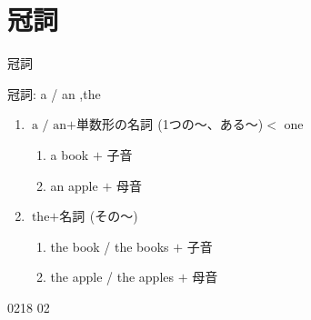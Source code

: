 \documentclass[aspectratio=169, xcolor={dvipsnames,table}]{beamer}
\begin{document}
  \section{冠詞}
  \begin{frame}[plain]{冠詞}
    \large

    冠詞: a / an ,\hspace{10pt}the

    \begin{enumerate}
      \item $\text{a / an}+ \text{単数形の名詞}$\,(1つの～、ある～)\hfill{}$<$ one
        \begin{enumerate}
          \item a book\hfill\textipa{/\textschwa /} $+$ 子音

          \item an apple\hfill{} $+$ 母音
        \end{enumerate}

      \item $\text{the}+ \text{名詞}$\,(その～)\hspace{10pt}{\small (単数形・複数形どちらにもつく)}
        \begin{enumerate}
          \item the book / the books\hfill\textipa{/\dh\textschwa/} $+$ 子音

          \item the apple / the apples\hfill{} $+$ 母音
        \end{enumerate}
    \end{enumerate}
    \hfill{\tiny 0218}\,{\scriptsize {}\,{\tiny 02}}
  \end{frame}
\end{document}
